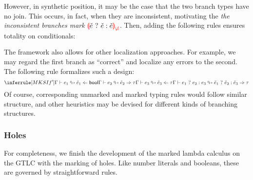However, in synthetic position, it may be the case that the two branch types have no join. This
occurs, in fact, when they are inconsistent, motivating the \emph{the inconsistent branches mark}
$\ECInconBr{\ECMV}{\ECMV}{\ECMV}$. Then, adding the following rules ensures totality on
conditionals:
%
\begin{mathpar}

\end{mathpar}

The framework also allows for other localization approaches. For example, we may regard the first
branch as ``correct'' and localize any errors to the second. The following rule formalizes such a
design:
\[%
  \judgment{
    \ctxAnaFixedInto{\ctx}{\EMV_1}{\ECMV_1}{\TBool} \\
    \ctxSynFixedInto{\ctx}{\EMV_2}{\ECMV_2}{\TMV} \\
    \ctxAnaFixedInto{\ctx}{\EMV_3}{\ECMV_3}{\TMV}
  }{
    \ctxSynFixedInto{\ctx}{\EIf{\EMV_1}{\EMV_2}{\EMV_3}}{\ECIf{\ECMV_1}{\ECMV_2}{\ECMV_3}}{\TMV}
  }{MKSIf'}
\]%
Of course, corresponding unmarked and marked typing rules would follow similar structure, and other
heuristics may be devised for different kinds of branching structures.

\subsubsection{Holes}
For completeness, we finish the development of the marked lambda calculus on the GTLC with the
marking of holes. Like number literals and booleans, these are governed by straightforward rules.
%
\begin{mathpar}

  
\end{mathpar}

